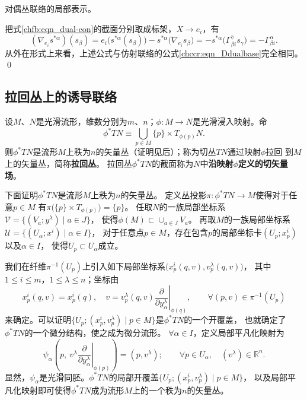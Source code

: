 \begin{example}
    对偶丛联络的局部表示。
\end{example}
把式\eqref{chfb:eqn_dual-con}的截面分别取成标架，$X\to {e_i}$，有
\begin{equation}\label{chfb:eqn_Dssg}
    (\nabla_{e_i} s^{*\alpha} )(s_\beta)= {e_i} \bigl(s^{*\alpha}(s_\beta)\bigr)
    -s^{*\alpha} \bigl(\nabla_{e_i} s_\beta\bigr)
    =-s^{*\alpha} \bigl( \Gamma_{\beta i}^\gamma s_\gamma \bigr)
    =-\Gamma_{\beta i}^\alpha .
\end{equation}
从外在形式上来看，上述公式与仿射联络的公式\eqref{chccr:eqn_Ddualbase}完全相同。 
\qed

 

\subsection{拉回丛上的诱导联络}\label{chfb:sec_pull-back-bundle}

设$M$、$N$是光滑流形，维数分别为$m$、$n$；$\phi:M\to N$是光滑浸入映射。命
\begin{equation}\label{chfb:eqn_pull-back-bundle}
    \phi^* TN \equiv \bigcup_{p \in M} \{p\}\times T_{\phi(p)} N .
\end{equation}
则$\phi^* TN$是流形$M$上秩为$n$的矢量丛（证明见后）；称为切丛$TN$通过映射$\phi$拉回
到$M$上的矢量丛，简称\textbf{拉回丛}。
拉回丛$\phi^* TN$的截面称为$N$中\textbf{沿映射$\phi$定义的切矢量场}。

下面证明$\phi^* TN$是流形$M$上秩为$n$的矢量丛。
定义丛投影$\pi : \phi^* TN \to M$使得对于任意$p\in M$
有$\pi\bigl(\{p\}\times T_{\phi(p)} \bigr)=\{p\} $。
任取$N$的一族局部坐标系$\mathcal{V}=\{(V_a; y^\lambda)\mid a \in J\}$，
使得$\phi(M)\subset \cup_{a\in J} V_a$。
再取$M$的一族局部坐标系$\mathcal{U}=\{(U_\alpha; x^i)\mid \alpha \in I\}$，
对于任意点$p\in M$，存在包含$p$的局部坐标卡$(U_p; x^i_p)$以及$\alpha\in I$，
使得$U_p \subset U_\alpha$成立。

我们在纤维$\pi^{-1}(U_p)$上引入如下局部坐标系$\bigl(x^i_p(q,v), v^\lambda_p(q,v)\bigr)$，
其中$1\leqslant i\leqslant m$，$ 1\leqslant \lambda \leqslant n$；坐标由
\begin{equation*}
    x^i_p(q,v)=x^i_p(q),\quad
    v=v^\lambda_p(q,v)\left.\frac{\partial}{\partial y^\lambda_\alpha}\right|_{\phi(q)} ,
    \qquad \forall (p,v)\in \pi^{-1}(U_p)
\end{equation*}
来确定。可以证明$\{U_p; (x^i_p, v^\lambda_p ) \mid p\in M\}$是$\phi^*TN$的一个开覆盖，
也就确定了$\phi^*TN$的一个微分结构，使之成为微分流形。
$\forall \alpha \in I$，定义局部平凡化映射为
\begin{equation*}
    \psi_\alpha \left(p,\  v^\lambda \left.\frac{\partial}{\partial y^\lambda_\alpha}\right|_{\phi(p)} \right)
    = (p, v^\lambda); \qquad
    \forall p\in U_\alpha, \quad (v^\lambda)\in \mathbb{R}^n .
\end{equation*}
显然，$\psi_\alpha$是光滑同胚。$\phi^*TN$的局部开覆盖$\{U_p; (x^i_p, v^\lambda_p ) \mid p\in M\}$，
以及局部平凡化映射即可使得$\phi^*TN$成为流形$M$上的一个秩为$n$的矢量丛。

